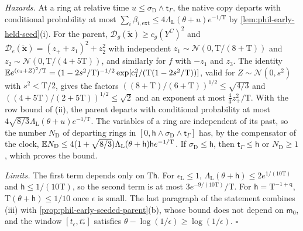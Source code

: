 \emph{Hazards.} At a ring at relative time
\(u\le\sigma_{\mathrm D}\wedge\mathsf t_\Gamma\), the native copy departs with
conditional probability at most
\(\sum_i\beta_{i,\mathrm{ext}}\le4\Lambda_{\mathrm L}(\theta+u)e^{-1/\mathrm T}\)
by \cref{lem:phil-early-held-seed}(i). For the parent,
\(\mathcal D_g(\widetilde{\mathbf x})\ge c_g(Y^C)^2\) and
\(\mathcal D_e(\widetilde{\mathbf x})=(z_++z_1)^2+z_2^2\) with independent
\(z_1\sim\mathcal N(0,\mathrm T/(8+\mathrm T))\) and
\(z_2\sim\mathcal N(0,\mathrm T/(4+5\mathrm T))\), and similarly for \(f\) with
\(-z_1\) and \(z_3\). The identity
\(\mathbb E e^{(\mathrm c_1+Z)^2/\mathrm T}=(1-2s^2/\mathrm T)^{-1/2}
\exp[\mathrm c_1^2/(\mathrm T(1-2s^2/\mathrm T))]\), valid for
\(Z\sim\mathcal N(0,s^2)\) with \(s^2<\mathrm T/2\), gives the factors
\(((8+\mathrm T)/(6+\mathrm T))^{1/2}\le\sqrt{4/3}\) and
\(((4+5\mathrm T)/(2+5\mathrm T))^{1/2}\le\sqrt2\) and an exponent at most
\(\frac43z_+^2/\mathrm T\). With the row bound of (ii), the parent departs with
conditional probability at most
\(4\sqrt{8/3}\Lambda_{\mathrm L}(\theta+u)e^{-1/\mathrm T}\). The variables of
a ring are independent of its past, so the number \(N_{\mathrm D}\) of
departing rings in \([0,\mathsf h\wedge\sigma_{\mathrm D}\wedge\mathsf t_\Gamma]\)
has, by the compensator of the clock,
\(\mathbb E N_{\mathrm D}\le4(1+\sqrt{8/3})\Lambda_{\mathrm L}(\theta+\mathsf h)
\mathsf he^{-1/\mathrm T}\). If \(\sigma_{\mathrm D}\le\mathsf h\), then
\(\mathsf t_\Gamma\le\mathsf h\) or \(N_{\mathrm D}\ge1\), which proves the bound.

\emph{Limits.} The first term depends only on \(\mathrm T\mathsf h\). For
\(\epsilon_{\mathrm L}\le1\),
\(\Lambda_{\mathrm L}(\theta+\mathsf h)\le2e^{1/(10\mathrm T)}\) and
\(\mathsf h\le1/(10\mathrm T)\), so the second term is at most
\(3e^{-9/(10\mathrm T)}/\mathrm T\). For \(\mathsf h=\mathrm T^{-1+\mathrm q}\),
\(\mathrm T(\theta+\mathsf h)\le1/10\) once \(\epsilon\) is small. The last
paragraph of the statement combines (iii) with
\cref{prop:phil-early-seeded-parent}(b), whose bound does not depend on
\(\mathsf m_0\), and the window \([t_\epsilon,t^\circ_*]\) satisfies
\(\theta-\log(1/\epsilon)\ge\log(1/\epsilon)\). \(\square\)

